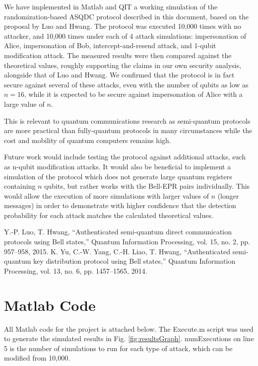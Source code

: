 \documentclass[conference,compsoc]{IEEEtran}
\begin{document}
We have implemented in Matlab and QIT a working simulation of the
randomization-based ASQDC protocol
described in this document, based on the proposal by Luo and Hwang.
The protocol was executed 10,000 times with no attacker, and 10,000 times under
each of 4 attack simulations: impersonation of Alice, impersonation of Bob, intercept-and-resend
attack, and 1-qubit modification attack. The measured results were
then compared against the theoretical values, roughly supporting the claims
in our own security analysis, alongside that of Luo and Hwang.
We confirmed that the protocol is in fact secure against several of these
attacks, even with the number of qubits as low as $n=16$, while it is expected to be
secure against impersonation of Alice with a large value of $n$.

This is relevant to quantum communications research as semi-quantum protocols
are more practical than fully-quantum protocols in many
circumstances while the cost and mobility of quantum computers remains high.

Future work would include testing the protocol against additional
attacks, such as n-qubit modification attacks. It would also be beneficial
to implement a simulation of the protocol which does not generate large quantum registers
containing $n$ qubits, but rather works with the Bell-EPR pairs individually.
This would allow the execution of more simulations with larger values of $n$ (longer messages)
in order to demonstrate with higher confidence that the detection probability for each attack
matches the calculated theoretical values.

\begin{thebibliography}{00}
 Y.-P. Luo, T. Hwang, ``Authenticated semi-quantum direct communication protocols using Bell states,'' Quantum Information Processing, vol. 15, no. 2, pp. 957--958, 2015.
 K. Yu, C.-W. Yang, C.-H. Liao, T. Hwang, ``Authenticated semi-quantum key distribution protocol using Bell states,'' Quantum Information Processing, vol. 13, no. 6, pp. 1457--1565, 2014.
\end{thebibliography}
\vspace{12pt}

\appendix
\section{Matlab Code}
All Matlab code for the project is attached below. The {\ttfamily Execute.m} script was used to generate the simulated results in Fig. \ref{fig:resultsGraph}.
{\ttfamily numExecutions} on line 5 is the number of simulations to run for each type of attack, which can be modified from 10,000.

\onecolumn
{}






\end{document}
